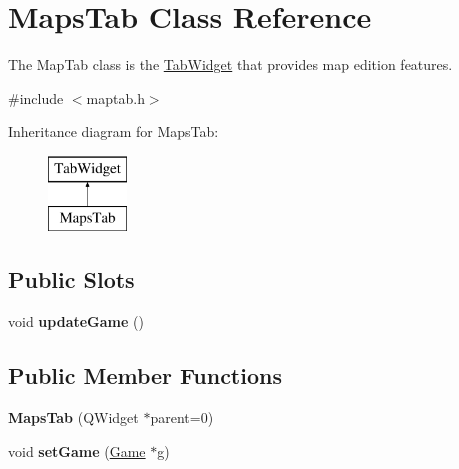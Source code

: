 \hypertarget{class_maps_tab}{\section{\-Maps\-Tab \-Class \-Reference}
\label{class_maps_tab}
}


\-The \-Map\-Tab class is the \hyperlink{class_tab_widget}{\-Tab\-Widget} that provides map edition features.  




{\ttfamily \#include $<$maptab.\-h$>$}

\-Inheritance diagram for \-Maps\-Tab\-:\begin{figure}[H]
\begin{center}
\leavevmode
\includegraphics[height=2.000000cm]{class_maps_tab}
\end{center}
\end{figure}
\subsection*{\-Public \-Slots}
\begin{DoxyCompactItemize}
\item 
\hypertarget{class_maps_tab_a1983576710cfc5be47e8f8ffee580036}{void {\bfseries update\-Game} ()}\label{class_maps_tab_a1983576710cfc5be47e8f8ffee580036}

\end{DoxyCompactItemize}
\subsection*{\-Public \-Member \-Functions}
\begin{DoxyCompactItemize}
\item 
\hypertarget{class_maps_tab_a65f3887b8248421638a03a034a4ff8ed}{{\bfseries \-Maps\-Tab} (\-Q\-Widget $\ast$parent=0)}\label{class_maps_tab_a65f3887b8248421638a03a034a4ff8ed}

\item 
\hypertarget{class_maps_tab_ae5b95aa6d6ab4209655d79873b877e82}{void {\bfseries set\-Game} (\hyperlink{class_game}{\-Game} $\ast$g)}\label{class_maps_tab_ae5b95aa6d6ab4209655d79873b877e82}

\end{DoxyCompactItemize}


